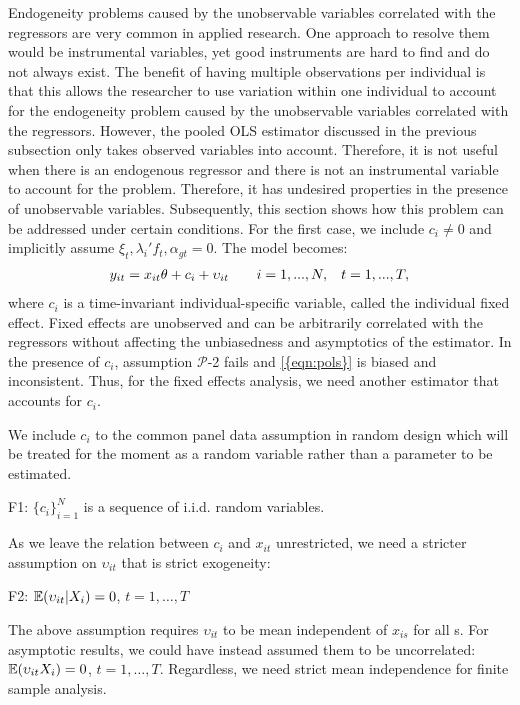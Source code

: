  Endogeneity problems caused by the unobservable variables correlated with the regressors are very common in applied research. One approach to resolve them would be instrumental variables, yet good instruments are hard to find and do not always exist. The benefit of having multiple observations per individual is that this allows the researcher to use variation within one individual to  account for the endogeneity problem caused by the unobservable variables correlated with the regressors. However, the pooled OLS estimator discussed in the previous subsection only takes observed variables into account. Therefore, it is not useful when there is an endogenous regressor and there is not an instrumental variable to account for the problem. Therefore, it has undesired properties in the presence of unobservable variables. Subsequently, this section shows how this problem can be addressed under certain conditions.
For the first case, we include $c_i \neq 0 $ and implicitly assume
$\xi_t, \lambda_i' f_t, \alpha_{gt} = 0 $. The model becomes:
\begin{align}\label{eqn:fe}
    y_{it} = x_{it}\theta + c_i + \upsilon_{it} \hspace{0.7cm} i=1,...,N, \hspace{0.3cm} t=1,...,T,
\end{align}
where $c_i$ is a time-invariant individual-specific variable, called the individual fixed effect. Fixed effects are unobserved and can be arbitrarily correlated with the regressors without affecting the unbiasedness and asymptotics of the estimator. In the presence of $c_i$, assumption $\mathcal{P}$-2 fails and \eqref{{eqn:pols}} is biased and inconsistent. Thus, for the fixed effects analysis, we need another estimator that accounts for $c_i$.

We include $c_i$ to the common panel data assumption in random design which will be treated for the moment as a random variable rather than a parameter to be estimated.
\begin{assumption}F1:  $\{c_i\}_{i=1}^N$ is a sequence of i.i.d. random variables. %
\end{assumption}
As we leave the relation between $c_i$ and $x_{it}$ unrestricted, we need a stricter assumption on $\upsilon_{it}$ that is strict exogeneity: 
 \begin{assumption}F2: 
 $\operatorname{\mathbb{E}}(\upsilon_{it}|X_i) = 0$, $t=1, \dots, T$ 
 \end{assumption}
The above assumption requires $\upsilon_{it}$ to be mean independent of $x_{is}$ for all s. For asymptotic results, we could have instead assumed them to be uncorrelated:$\operatorname{\mathbb{E}}(\upsilon_{it}X_i) = 0$, $t=1, \dots, T$. Regardless, we need strict mean independence for finite sample analysis.

